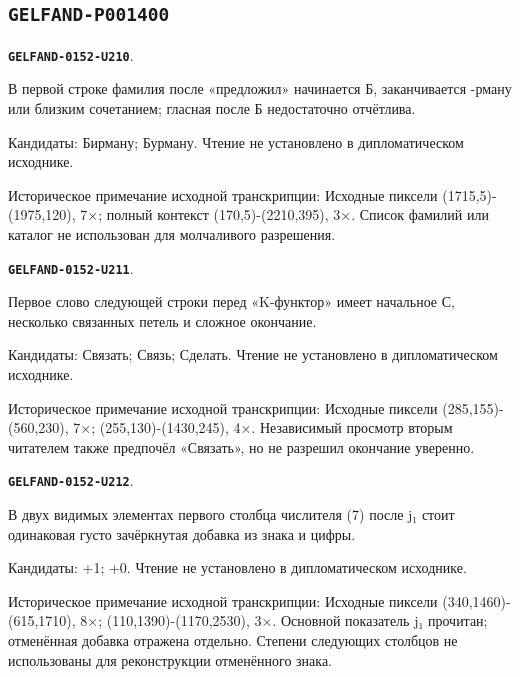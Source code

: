 \documentclass[11pt]{article}
\theoremstyle{definition}
\theoremstyle{remark}
\begin{document}
\subsection*{\texttt{GELFAND-P001400}}
\par\noindent\leavevmode{}\label{GELFAND-0152-U210}\label{GELFAND-P001400:heading-recipient:note}\textbf{\texttt{GELFAND-0152-U210}}.\nopagebreak[4]\par
В первой строке фамилия после «предложил» начинается Б, заканчивается -рману или близким сочетанием; гласная после Б недостаточно отчётлива.\par
Кандидаты: Бирману; Бурману. Чтение не установлено в дипломатическом исходнике.\par
Историческое примечание исходной транскрипции: Исходные пиксели (1715,5)-(1975,120), 7×; полный контекст (170,5)-(2210,395), 3×. Список фамилий или каталог не использован для молчаливого разрешения.\par\medskip
\par\noindent\leavevmode{}\label{GELFAND-0152-U211}\label{GELFAND-P001400:heading-verb:note}\textbf{\texttt{GELFAND-0152-U211}}.\nopagebreak[4]\par
Первое слово следующей строки перед «K-функтор» имеет начальное С, несколько связанных петель и сложное окончание.\par
Кандидаты: Связать; Связь; Сделать. Чтение не установлено в дипломатическом исходнике.\par
Историческое примечание исходной транскрипции: Исходные пиксели (285,155)-(560,230), 7×; (255,130)-(1430,245), 4×. Независимый просмотр вторым читателем также предпочёл «Связать», но не разрешил окончание уверенно.\par\medskip
\par\noindent\leavevmode{}\label{GELFAND-0152-U212}\label{GELFAND-P001400:numerator-first-column-cancellations:note}\textbf{\texttt{GELFAND-0152-U212}}.\nopagebreak[4]\par
В двух видимых элементах первого столбца числителя (7) после j₁ стоит одинаковая густо зачёркнутая добавка из знака и цифры.\par
Кандидаты: +1; +0. Чтение не установлено в дипломатическом исходнике.\par
Историческое примечание исходной транскрипции: Исходные пиксели (340,1460)-(615,1710), 8×; (110,1390)-(1170,2530), 3×. Основной показатель j₁ прочитан; отменённая добавка отражена отдельно. Степени следующих столбцов не использованы для реконструкции отменённого знака.\par\medskip
\end{document}
